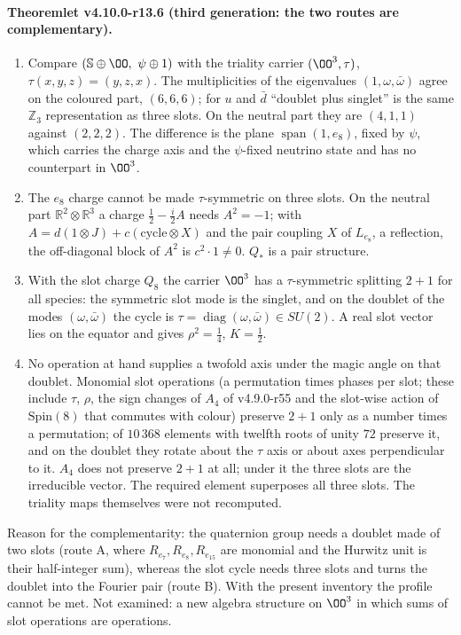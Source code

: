 \paragraph{Theoremlet v4.10.0-r13.6 (third generation: the two routes are complementary).}
\begin{enumerate}[leftmargin=2em]
\item[(a)] Compare \((\mathbb S\oplus\OO,\ \psi\oplus1)\) with the triality carrier \((\OO^3,\tau)\), \(\tau(x,y,z)=(y,z,x)\).  The
multiplicities of the eigenvalues \((1,\omega,\bar\omega)\) agree on the coloured part, \((6,6,6)\); for \(u\) and \(\bar d\)
``doublet plus singlet'' is the same \(\mathbb Z_3\) representation as three slots.  On the neutral part they are \((4,1,1)\)
against \((2,2,2)\).  The difference is the plane \(\operatorname{span}(1,e_8)\), fixed by \(\psi\), which carries the charge axis and
the \(\psi\)-fixed neutrino state and has no counterpart in \(\OO^3\).
\item[(b)] The \(e_8\) charge cannot be made \(\tau\)-symmetric on three slots.  On the neutral part
\(\mathbb R^2\otimes\mathbb R^3\) a charge \(\tfrac12-\tfrac i2A\) needs \(A^2=-1\); with \(A=d(1\otimes J)+c(\text{cycle}\otimes X)\) and
the pair coupling \(X\) of \(L_{e_8}\), a reflection, the off-diagonal block of \(A^2\) is \(c^2\cdot1\neq0\).  \(Q_*\) is a pair
structure.
\item[(c)] With the slot charge \(Q_8\) the carrier \(\OO^3\) has a \(\tau\)-symmetric splitting \(2+1\) for all species: the
symmetric slot mode is the singlet, and on the doublet of the modes \((\omega,\bar\omega)\) the cycle is
\(\tau=\operatorname{diag}(\omega,\bar\omega)\in SU(2)\).  A real slot vector lies on the equator and gives \(\rho^2=\tfrac14\),
\(K=\tfrac12\).
\item[(d)] No operation at hand supplies a twofold axis under the magic angle on that doublet.  Monomial slot operations
(a permutation times phases per slot; these include \(\tau\), \(\rho\), the sign changes of \(A_4\) of v4.9.0-r55 and the
slot-wise action of \(\mathrm{Spin}(8)\) that commutes with colour) preserve \(2+1\) only as a number times a permutation; of
\(10\,368\) elements with twelfth roots of unity \(72\) preserve it, and on the doublet they rotate about the \(\tau\) axis or
about axes perpendicular to it.  \(A_4\) does not preserve \(2+1\) at all; under it the three slots are the irreducible
vector.  The required element superposes all three slots.  The triality maps themselves were not recomputed.
\end{enumerate}
Reason for the complementarity: the quaternion group needs a doublet made of two slots (route A, where
\(R_{e_7},R_{e_8},R_{e_{15}}\) are monomial and the Hurwitz unit is their half-integer sum), whereas the slot cycle needs
three slots and turns the doublet into the Fourier pair (route B).  With the present inventory the profile cannot be met.
Not examined: a new algebra structure on \(\OO^3\) in which sums of slot operations are operations.

